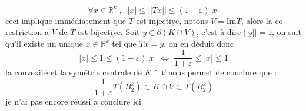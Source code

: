 \documentclass{report}
\begin{document}
\begin{enumerate}[leftmargin=\labelsep]
	\begin{equation*}
	\forall x \in \mathbb{R}^k \; , \;\; |x|\leq ||Tx||\leq (1+\varepsilon)|x|
	\end{equation*}
	ceci implique immédiatement que $T$ est injective, notons $V=\text{Im}T$, alors la co-restriction a $V$ de $T$ est bijective.
	Soit $y\in \partial(K\cap V)$, c'est à dire $||y||=1$, on sait qu'il existe un unique $x\in\mathbb{R}^k$ tel que $Tx=y$, on en déduit donc 
	\begin{equation*}
	|x|\leq 1 \leq (1+\varepsilon)|x|\; \iff\; \frac{1}{1+\varepsilon}\leq|x|\leq 1
	\end{equation*}
	la convexité et la symétrie centrale de $K\cap V$ nous permet de conclure que  :
	\begin{equation}
		\frac{1}{1+\varepsilon}T(B_2^k)\subset K\cap V \subset T(B_2^k)
	\end{equation}
	\color{blue} je n'ai pas encore réussi a conclure ici\color{black}
\end{enumerate}
\newpage
\end{document}
